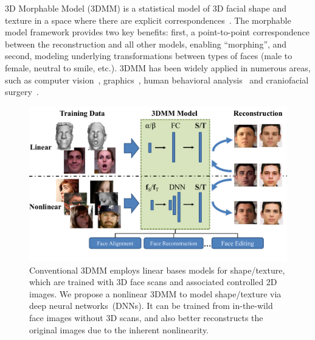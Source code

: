 
\label{sec:intro}
3D Morphable Model (3DMM) is a statistical model of 3D facial shape and texture in a space where there are explicit correspondences~\cite{blanz1999morphable}. 
The morphable model framework provides two key benefits: first, a point-to-point correspondence between the reconstruction and all other models, enabling “morphing”,
and second, modeling underlying transformations between types of faces (male to female, neutral to smile, etc.). 
3DMM has been widely applied in numerous areas, such as computer vision~\cite{blanz1999morphable, yin2017towards}, graphics~\cite{aldrian2013inverse}, human behavioral analysis~\cite{amberg2008expression} and craniofacial surgery~\cite{staal2015describing}.


\begin{figure}[t!]
\centering
\includegraphics[trim=0 30 12 0, clip, width=\linewidth]{img/Concept.pdf}
\vspace{-4mm}
\caption{\small Conventional 3DMM employs linear bases models for shape/texture, which are trained with 3D face scans and associated controlled 2D images. We propose a nonlinear 3DMM to model shape/texture via deep neural networks~(DNNs). It can be trained from in-the-wild face images without 3D scans, and also better reconstructs the original images due to the inherent nonlinearity.}
\label{fig:concept}
\figvspace 
\end{figure}

